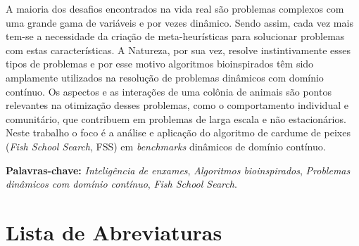 
\bacharelado {}
\data {\today}



\ttorientador{$ $}
\ttexaminadorum{$ $}
\ttexaminadordois{$ $}

\newpage
\pagestyle{empty}

\maketitle




A maioria dos desafios encontrados na vida real são problemas complexos com uma grande gama de variáveis e por vezes dinâmico. Sendo assim, cada vez mais tem-se a necessidade da criação de meta-heurísticas para solucionar problemas com estas características. A Natureza, por sua vez, resolve instintivamente esses tipos de problemas e por esse motivo algoritmos bioinspirados têm sido amplamente utilizados na resolução de problemas dinâmicos com domínio contínuo. Os aspectos e as interações de uma colônia de animais são pontos relevantes na otimização desses problemas, como o comportamento individual e comunitário, que contribuem em problemas de larga escala e não estacionários. Neste trabalho o foco é a análise e aplicação do algoritmo de cardume de peixes (\textit{Fish School Search}, FSS) em \textit{benchmarks} dinâmicos de domínio contínuo.

\noindent \textbf{Palavras-chave:} \textit{Inteligência de enxames}, \textit{Algoritmos bioinspirados}, \textit{Problemas dinâmicos com domínio contínuo}, \textit{Fish School Search}.

\tableofcontents
\listoffigures
\listoftables
\newpage
\chapter*{Lista de Abreviaturas\hfill} 
\listofsymbols

\newpage
\pagestyle{myheadings}

